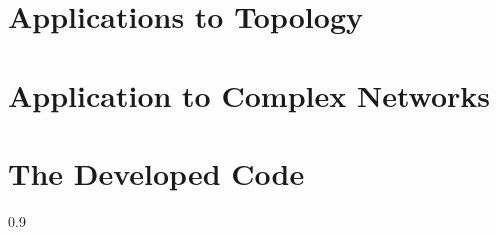 \documentclass[a4paper,12pt,oneside,customfont,custombib,PageStyleI]{Settings/PhDThesisPSnPDF}
\begin{document}
\chapter{Applications to Topology}\label{chap:chapter3}




\chapter{Application to Complex Networks}\label{chap:chapter4}




\chapter{The Developed Code}\label{chap:chapter5}





%

\backmatter

\begin{spacing}{0.9}

\cleardoublepage
\nocite{*}
\printbibliography[heading=bibintoc, title={References}]

\end{spacing}

\end{document}
